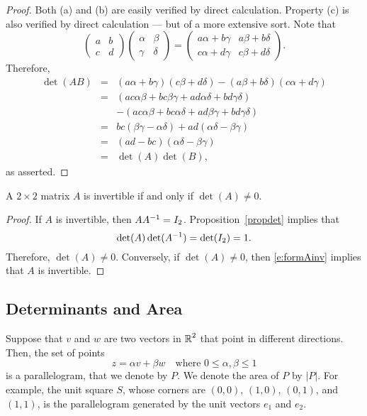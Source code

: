 \documentclass{ximera}
\begin{document}
\begin{proof} Both (a) and (b) are easily verified by direct
calculation.  Property (c) is also verified by direct
calculation --- but of a more extensive sort.  Note that
\[
\left(\begin{array}{cc} a & b\\ c & d \end{array}\right)
\left(\begin{array}{cc} \alpha & \beta \\ \gamma & \delta
\end{array}\right) =
\left(\begin{array}{cc} a\alpha+b\gamma & a\beta+b\delta \\
c\alpha+d\gamma & c\beta+d\delta\end{array}\right).
\]
Therefore,
\begin{eqnarray*}
\det(AB) & = & (a\alpha+b\gamma)(c\beta+d\delta) -
     (a\beta+b\delta)(c\alpha+d\gamma)\\
& = & (ac\alpha\beta+bc\beta\gamma+ad\alpha\delta+bd\gamma\delta) \\
& & -(ac\alpha\beta+bc\alpha\delta+ad\beta\gamma+bd\gamma\delta)\\
& = & bc(\beta\gamma-\alpha\delta) +
ad(\alpha\delta-\beta\gamma) \\
& = & (ad-bc)(\alpha\delta-\beta\gamma) \\
& = & \det(A)\det(B),
\end{eqnarray*}
as asserted.   \end{proof}

\begin{corollary}  \label{C:2x2invert} 
A $2\times 2$ matrix $A$ is invertible if and only if $\det(A)\neq 0$.
\end{corollary}

\begin{proof}  If $A$ is invertible, then $AA^{-1} = I_2$.
Proposition~\ref{propdet} implies that
\[
\det(A)\det(A^{-1}) = \det(I_2) = 1.
\]
Therefore, $\det(A)\neq 0$.  Conversely, if $\det(A)\neq 0$, then
\eqref{e:formAinv} implies that $A$ is invertible.  \end{proof}


\subsection*{Determinants and Area}

Suppose that $v$ and $w$ are two vectors in $\mbox{$\Bbb{R}$}^2$ that point in different
directions.  Then, the set of points
\[
z=\alpha v + \beta w \quad\mbox{where } 0\leq\alpha,\beta\leq 1
\]
is a parallelogram, that we denote by $P$.
We denote the area of $P$ by $|P|$.  For example, the unit square $S$, whose
corners are $(0,0)$, $(1,0)$, $(0,1)$, and $(1,1)$, is the parallelogram
generated by the unit vectors $e_1$ and $e_2$.
\end{document}

